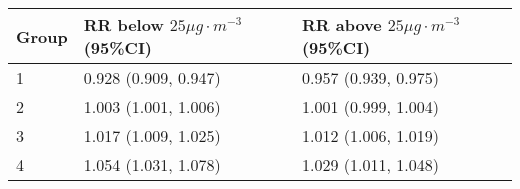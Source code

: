\begin{tabular}{lll}
  \hline
Group & RR below $25 \mu g \cdot m^{-3}$ (95\%CI) & RR above $25 \mu g \cdot m^{-3}$ (95\%CI) \\ 
  \hline
   1 & 0.928 (0.909, 0.947) & 0.957 (0.939, 0.975) \\ 
     2 & 1.003 (1.001, 1.006) & 1.001 (0.999, 1.004) \\ 
     3 & 1.017 (1.009, 1.025) & 1.012 (1.006, 1.019) \\ 
     4 & 1.054 (1.031, 1.078) & 1.029 (1.011, 1.048) \\ 
   \hline
\end{tabular}

